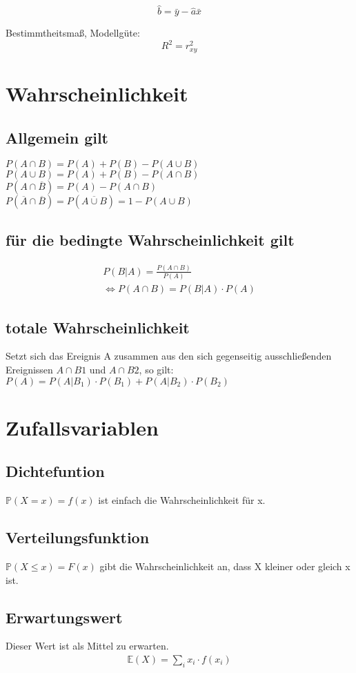 \documentclass[a4paper, twocolumn]{article}
\begin{document}
        \begin{displaymath}
            \hat b = \bar y - \hat a \bar x
        \end{displaymath}
        
        Bestimmtheitsmaß, Modellgüte:
        \begin{displaymath}
          R^2 = r^2_{xy}
        \end{displaymath}
        
\section{Wahrscheinlichkeit}
	\subsection{Allgemein gilt} 
	$ P(A \cap B) = P(A) + P(B) - P(A \cup B)  $ \\
	$ P(A \cup B) = P(A) + P(B) - P(A \cap B) $ \\
	$ P(A \cap \overline B) = P(A) - P(A \cap B) $ \\
	$ P(\overline A  \cap \overline B) = P(\overline{A \cup B}) = 1 - P(A \cup B) $
	
	\subsection{für die bedingte Wahrscheinlichkeit gilt}
	\begin{gather*}
	P(B|A) = \frac{ P(A \cap B) }{ P(A) } \\
	\Leftrightarrow P(A \cap B) = P(B|A) \cdot P(A)
	\end{gather*}
	
	\subsection{totale Wahrscheinlichkeit}
	Setzt sich das Ereignis A zusammen aus den sich gegenseitig ausschließenden 
	Ereignissen $A \cap B1$ und $A \cap B2$, so gilt: \\
	$  P(A) = P(A | B_1) \cdot P(B_1) + P(A | B_2) \cdot P(B_2) $
	
\section{Zufallsvariablen}
	\subsection{Dichtefuntion} $ \mathbb{P}(X=x) = f(x) $ ist einfach die Wahrscheinlichkeit für x.

	\subsection{Verteilungsfunktion} $ \mathbb{P}(X \le x) = F(x) $ gibt die Wahrscheinlichkeit an, dass X kleiner oder gleich x ist.
	
	\subsection{Erwartungswert}
	Dieser Wert ist als Mittel zu erwarten.
	\begin{gather*}
		\mathbb{E}(X) = \sum_i x_i \cdot f(x_i)
	\end{gather*}
\end{document}
